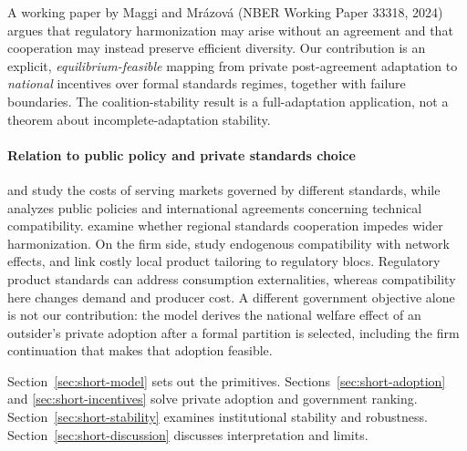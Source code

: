 A working paper by Maggi and Mr{\'{a}}zov{\'{a}} (NBER Working Paper 33318, 2024) argues that regulatory harmonization may arise without an agreement and that cooperation may instead preserve efficient diversity. Our contribution is an explicit, \emph{equilibrium-feasible} mapping from private post-agreement adaptation to \emph{national} incentives over formal standards regimes, together with failure boundaries. The coalition-stability result is a full-adaptation application, not a theorem about incomplete-adaptation stability.

\paragraph{Relation to public policy and private standards choice} \citet{fischerSerra2000} and \citet{grossmanMcCalmanStaiger2021} study the costs of serving markets governed by different standards, while \citet{klimenko2009} analyzes public policies and international agreements concerning technical compatibility. \citet{kawabataTakarada2021} examine whether regional standards cooperation impedes wider harmonization. On the firm side, \citet{buccellaEtAl2023} study endogenous compatibility with network effects, and \citet{parentiVannoorenberghe2025} link costly local product tailoring to regulatory blocs. Regulatory product standards can address consumption externalities, whereas compatibility here changes demand and producer cost. A different government objective alone is not our contribution: the model derives the national welfare effect of an outsider's private adoption after a formal partition is selected, including the firm continuation that makes that adoption feasible.

Section~\ref{sec:short-model} sets out the primitives. Sections~\ref{sec:short-adoption} and \ref{sec:short-incentives} solve private adoption and government ranking. Section~\ref{sec:short-stability} examines institutional stability and robustness. Section~\ref{sec:short-discussion} discusses interpretation and limits.
